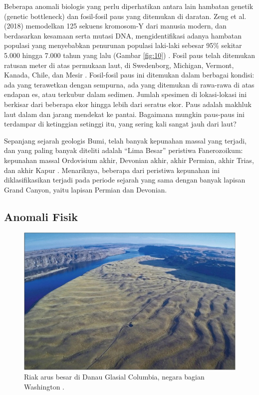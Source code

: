 \documentclass[10pt,twocolumn,letterpaper]{article}
\begin{document}
Beberapa anomali biologis yang perlu diperhatikan antara lain hambatan genetik (genetic bottleneck) dan fosil-fosil paus yang ditemukan di daratan. Zeng et al. (2018) memodelkan 125 sekuens kromosom-Y dari manusia modern, dan berdasarkan kesamaan serta mutasi DNA, mengidentifikasi adanya hambatan populasi yang menyebabkan penurunan populasi laki-laki sebesar 95\% sekitar 5.000 hingga 7.000 tahun yang lalu (Gambar \ref{fig:10}) \cite{62}. Fosil paus telah ditemukan ratusan meter di atas permukaan laut, di Swedenborg, Michigan, Vermont, Kanada, Chile, dan Mesir \cite{63,64,65,66}. Fosil-fosil paus ini ditemukan dalam berbagai kondisi: ada yang terawetkan dengan sempurna, ada yang ditemukan di rawa-rawa di atas endapan es, atau terkubur dalam sedimen. Jumlah spesimen di lokasi-lokasi ini berkisar dari beberapa ekor hingga lebih dari seratus ekor. Paus adalah makhluk laut dalam dan jarang mendekat ke pantai. Bagaimana mungkin paus-paus ini terdampar di ketinggian setinggi itu, yang sering kali sangat jauh dari laut?

Sepanjang sejarah geologis Bumi, telah banyak kepunahan massal yang terjadi, dan yang paling banyak diteliti adalah “Lima Besar” peristiwa Fanerozoikum: kepunahan massal Ordovisium akhir, Devonian akhir, akhir Permian, akhir Trias, dan akhir Kapur \cite{88,89}. Menariknya, beberapa dari peristiwa kepunahan ini diklasifikasikan terjadi pada periode sejarah yang sama dengan banyak lapisan Grand Canyon, yaitu lapisan Permian dan Devonian.

\subsection{Anomali Fisik}

\begin{figure}[b]
\begin{center}
   \includegraphics[width=1\linewidth]{columbia.jpg}
\end{center}
   \caption{Riak arus besar di Danau Glasial Columbia, negara bagian Washington \cite{80}.}
\label{fig:11}
\label{fig:onecol}
\end{figure}
\end{document}
